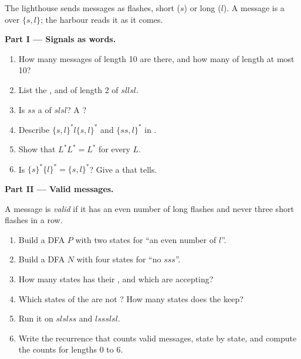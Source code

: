 \begin{problem}\label{pb:b2:finite-automata:1}
The lighthouse sends messages as flashes, short ($s$) or long ($l$). A message is a  over $\{s, l\}$; the harbour
reads it as it comes.

\medskip\noindent\textbf{Part I --- Signals as words.}\par\nopagebreak
\begin{enumerate}
\item How many messages of length 10 are there, and how many of length at most 10?
\item List the ,  and  of length 2 of $sllsl$.
\item Is $ss$ a  of $slsl$? A ?
\item Describe $\{s, l\}^* l \{s, l\}^*$ and $\{ss, l\}^*$ in .
\item Show that $L^* L^* = L^*$ for every  $L$.
\item Is $\{s\}^* \{l\}^* = \{s, l\}^*$? Give a  that tells.
\end{enumerate}

\medskip\noindent\textbf{Part II --- Valid messages.}\par\nopagebreak
A message is \emph{valid} if it has an even number of long flashes and never three short flashes in a row.
\begin{enumerate}[resume, beginpenalty=10000]
\item Build a  DFA $P$ with two states for ``an even number of $l$''.
\item Build a  DFA $N$ with four states for ``no  $sss$''.
\item How many states has their , and which are accepting?
\item Which states of the  are not ? How many states does the  keep?
\item Run it on $slslss$ and $lssslsl$.
\item Write the recurrence that counts valid messages, state by state, and compute the counts for lengths 0 to 6.
\end{enumerate}


\end{problem}
